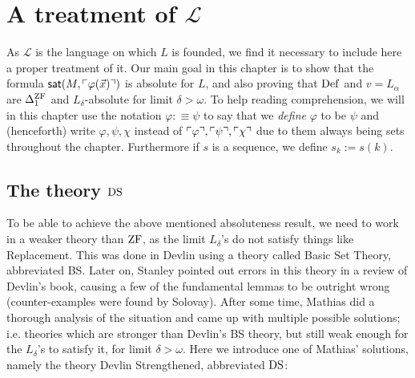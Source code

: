 \chapter{A treatment of $\mathscr L$}
\thispagestyle{fancy}
\label{apxA}

As $\mathscr L$ is the language on which $L$ is founded, we find it necessary to include here a proper treatment of it. Our main goal in this chapter is to show that the formula $\mathsf{sat}(M,\ulcorner \varphi(\vec{x}) \urcorner)$ is absolute for $L$, and also proving that $\operatorname{Def}$ and $v=L_\alpha$ are $\Delta_1^{\operatorname{ZF}}$ and $L_\delta$-absolute for limit $\delta>\omega$. To help reading comprehension, we will in this chapter use the notation $\varphi:\equiv\psi$ to say that we \textit{define} $\varphi$ to be $\psi$ and (henceforth) write $\varphi,\psi,\chi$ instead of $\ulcorner \varphi \urcorner,\ulcorner \psi \urcorner,\ulcorner \chi \urcorner$ due to them always being sets throughout the chapter. Furthermore if $s$ is a sequence, we define $s_k:=s(k)$.

\section{The theory $\operatorname{DS}$}
To be able to achieve the above mentioned absoluteness result, we need to work in a weaker theory than $\operatorname{ZF}$, as the limit $L_\delta$'s do not satisfy things like Replacement. This was done in Devlin \cite{Devlin} using a theory called Basic Set Theory, abbreviated BS. Later on, Stanley \cite{Stanley} pointed out errors in this theory in a review of Devlin's book, causing a few of the fundamental lemmas to be outright wrong (counter-examples were found by Solovay). After some time, Mathias \cite{Mathias} did a thorough analysis of the situation and came up with multiple possible solutions; i.e. theories which are stronger than Devlin's BS theory, but still weak enough for the $L_\delta$'s to satisfy it, for limit $\delta>\omega$. Here we introduce one of Mathias' solutions, namely the theory Devlin Strengthened, abbreviated $\operatorname{DS}$:

